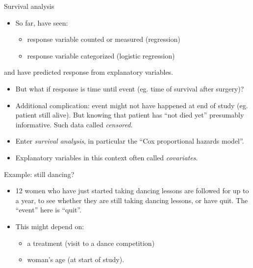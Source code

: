 \documentclass[ignorenonframetext,]{beamer}
\begin{document}
\begin{frame}{Survival analysis}
\protect\hypertarget{survival-analysis-1}{}

\begin{itemize}
\item
  So far, have seen:

  \begin{itemize}
  \item
    response variable counted or measured (regression)
  \item
    response variable categorized (logistic regression)
  \end{itemize}
\end{itemize}

and have predicted response from explanatory variables.

\begin{itemize}
\item
  But what if response is time until event (eg. time of survival after
  surgery)?
\item
  Additional complication: event might not have happened at end of study
  (eg. patient still alive). But knowing that patient has ``not died
  yet'' presumably informative. Such data called \emph{censored}.
\item
  Enter \emph{survival analysis}, in particular the ``Cox proportional
  hazards model''.
\item
  Explanatory variables in this context often called \emph{covariates}.
\end{itemize}

\end{frame}

\begin{frame}{Example: still dancing?}
\protect\hypertarget{example-still-dancing}{}

\begin{itemize}
\item
  12 women who have just started taking dancing lessons are followed for
  up to a year, to see whether they are still taking dancing lessons, or
  have quit. The ``event'' here is ``quit''.
\item
  This might depend on:

  \begin{itemize}
  \item
    a treatment (visit to a dance competition)
  \item
    woman's age (at start of study).
  \end{itemize}
\end{itemize}

\end{frame}
\end{document}
